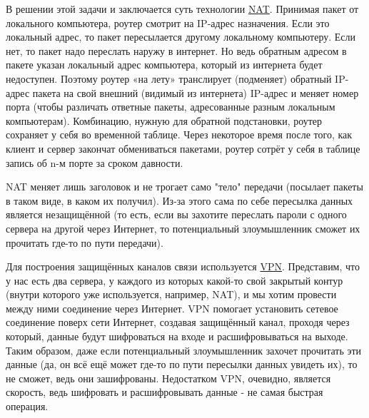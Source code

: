 В решении этой задачи и заключается суть технологии \href{https://ru.wikipedia.org/wiki/NAT}{NAT}. Принимая пакет от локального компьютера, роутер смотрит на IP-адрес назначения. Если это локальный адрес, то пакет пересылается другому локальному компьютеру. Если нет, то пакет надо переслать наружу в интернет. Но ведь обратным адресом в пакете указан локальный адрес компьютера, который из интернета будет недоступен. Поэтому роутер «на лету» транслирует (подменяет) обратный IP-адрес пакета на свой внешний (видимый из интернета) IP-адрес и меняет номер порта (чтобы различать ответные пакеты, адресованные разным локальным компьютерам). Комбинацию, нужную для обратной подстановки, роутер сохраняет у себя во временной таблице. Через некоторое время после того, как клиент и сервер закончат обмениваться пакетами, роутер сотрёт у себя в таблице запись об n-м порте за сроком давности.

NAT меняет лишь заголовок и не трогает само "тело" передачи (посылает пакеты в таком виде, в каком их получил). Из-за этого сама по себе пересылка данных является незащищённой (то есть, если вы захотите переслать пароли с одного сервера на другой через Интернет, то потенциальный злоумышленник сможет их прочитать где-то по пути передачи).

\bigskip    
Для построения защищённых каналов связи используется \href{https://ru.wikipedia.org/wiki/VPN}{VPN}. Представим, что у нас есть два сервера, у каждого из которых какой-то свой закрытый контур (внутри которого уже используется, например, NAT), и мы хотим провести между ними соединение через Интернет. VPN помогает установить сетевое соединение поверх сети Интернет, создавая защищённый канал, проходя через который, данные будут шифроваться на входе и расшифровываться на выходе.
Таким образом, даже если потенциальный злоумышленник захочет прочитать эти данные (да, он всё ещё может где-то по пути пересылки данных увидеть их), то не сможет, ведь они зашифрованы. Недостатком VPN, очевидно, является скорость, ведь шифровать и расшифровывать данные - не самая быстрая операция.